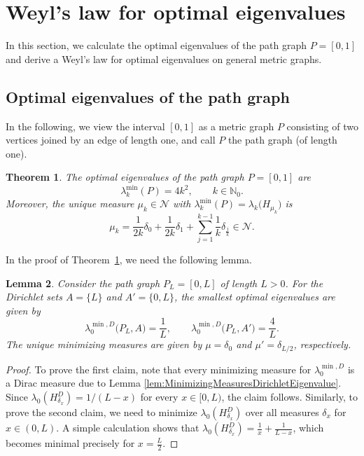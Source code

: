 \documentclass[reqno]{amsart}
\theoremstyle{plain}
\newtheorem{thm}{Theorem}[section]
\newtheorem{lem}[thm]{Lemma}
\theoremstyle{definition}
\theoremstyle{remark}
\numberwithin{equation}{section}
\newcommand{\N}{\mathbb{N}}     %
\newcommand{\cN}{\mathcal{N}}
\begin{document}

\section{Weyl's law for optimal eigenvalues} \label{sec:Weyl'sLaw}
In this section, we calculate the optimal eigenvalues of the path graph $P =[0,1]$ and derive a Weyl's law for optimal eigenvalues on general metric graphs.


\subsection{Optimal eigenvalues of the path graph}
In the following, we view the interval $[0,1]$ as a metric graph $P$ consisting of two vertices joined by an edge of length one, and call $P$ the path graph (of length one).

\begin{thm} \label{thm:ConfEVPath}
	The optimal eigenvalues of the path graph $P =[0,1]$ are
	\[
	\lambda_k^{\min} ( P ) = 4 k^2, \qquad k \in \N_{0}.
	\]
	Moreover, the unique measure $\mu_k \in \cN$ with $\lambda_k^{\min} ( P ) = \lambda_k \big( H_{\mu_k}\big )$ is
	\begin{equation} \label{eq:MinimizingMeasurePath}
		\mu_k =\frac{1}{2k} \delta_0 + \frac{1}{2k} \delta_1 + \sum_{j=1}^{k-1} \frac{1}{k} \delta_{\frac{j}{k}} \in \cN.
	\end{equation}
\end{thm}
In the proof of Theorem~\ref{thm:ConfEVPath}, we need the following lemma.


\begin{lem} \label{lem:SpectralGapEstimatesDirichletLaplacians}
	Consider the path graph $P_L = [0,L]$ of length $L>0$. For the Dirichlet sets $A =\{L\}$ and $A' =\{0, L\}$, the smallest optimal eigenvalues are given by
	\[
	\lambda_0^{\min, D}\big (P_L, A \big ) = \frac{1}{L}, \qquad \lambda_0^{\min, D}\big (P_L, A'\big ) = \frac{4}{L}.
	\]
	The unique minimizing measures are given by $\mu = \delta_0$ and $\mu' = \delta_{L/2}$, respectively.
\end{lem}

\begin{proof}
	To prove the first claim, note that every minimizing measure for $\lambda_0^{\min, D}$ is a Dirac measure due to Lemma \ref{lem:MinimizingMeasuresDirichletEigenvalue}. Since $\lambda_0(H_{\delta_x}^D) = 1/(L-x)$ for every $x \in [0,L)$, the claim follows. Similarly, to prove the second claim, we need to minimize $\lambda_{0}(H^D_{\delta_x})$ over all measures $\delta_x$ for $x \in (0,L)$. A simple calculation shows that $\lambda_{0}(H^D_{\delta_x}) = \frac{1}{x} + \frac{1}{L-x}$, which becomes minimal precisely for $x = \frac{L}{2}$.
\end{proof}
\end{document}
